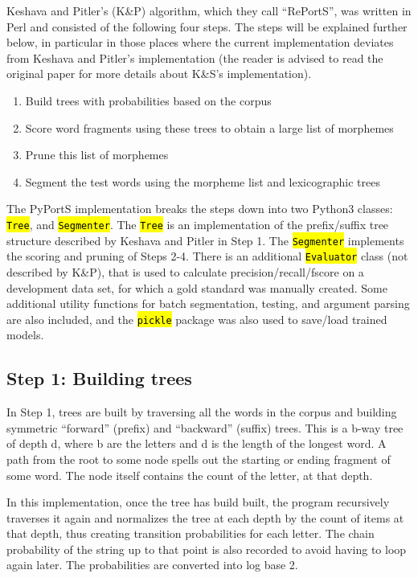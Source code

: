 \documentclass[paper=a4, fontsize=11pt]{article}
\newcommand{\hlc}[1]{\texttt{\hl{#1}}}
\begin{document}
Keshava and Pitler's (K\&P) algorithm, which they call ``RePortS'', was written in Perl and consisted of the following four steps. The steps will be explained further below, in particular in those places where the current implementation deviates from Keshava and Pitler's implementation (the reader is advised to read the original paper for more details about K\&S's implementation).

\begin{enumerate}
\item{Build trees with probabilities based on the corpus}
\item{Score word fragments using these trees to obtain a large list of morphemes}
\item{Prune this list of morphemes}
\item{Segment the test words using the morpheme list and lexicographic trees}
\end{enumerate}

The PyPortS implementation breaks the steps down into two Python3 classes: \hlc{Tree}, and \hlc{Segmenter}. The \hlc{Tree} is an implementation of the prefix/suffix tree structure described by Keshava and Pitler in Step 1. The \hlc{Segmenter} implements the scoring and pruning of Steps 2-4. There is an additional \hlc{Evaluator} class (not described by K\&P), that is used to calculate precision/recall/fscore on a development data set, for which a gold standard was manually created. Some additional utility functions for batch segmentation, testing, and argument parsing are also included, and the \hlc{pickle} package was also used to save/load trained models.

\subsection{Step 1: Building trees}

In Step 1, trees are built by traversing all the words in the corpus and building symmetric ``forward'' (prefix) and ``backward'' (suffix) trees. This is a b-way tree of depth d, where b are the letters and d is the length of the longest word. A path from the root to some node spells out the starting or ending fragment of some word. The node itself contains the count of the letter, at that depth. 

In this implementation, once the tree has build built, the program recursively traverses it again and normalizes the tree at each depth by the count of items at that depth, thus creating transition probabilities for each letter. The chain probability of the string up to that point is also recorded to avoid having to loop again later. The probabilities are converted into log base 2. 
\end{document}
